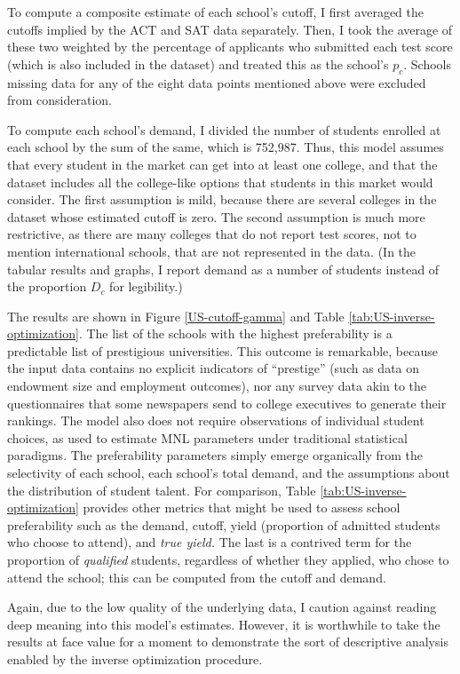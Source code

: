 \documentclass[12pt]{article}
\numberwithin{equation}{subsection}
\theoremstyle{definition}
\begin{document}
To compute a composite estimate of each school's cutoff, I first averaged the cutoffs implied by the ACT and SAT data separately. Then, I took the average of these two weighted by the percentage of applicants who submitted each test score (which is also included in the dataset) and treated this as the school's $p_c$. Schools missing data for any of the eight data points mentioned above were excluded from consideration.

To compute each school's demand, I divided the number of students enrolled at each school by the sum of the same, which is 752,987. Thus, this model assumes that every student in the market can get into at least one college, and that the dataset includes all the college-like options that students in this market would consider. The first assumption is mild, because there are several colleges in the dataset whose estimated cutoff is zero. The second assumption is much more restrictive, as there are many colleges that do not report test scores, not to mention international schools, that are not represented in the data. (In the tabular results and graphs, I report demand as a number of students instead of the proportion $D_c$ for legibility.)

The results are shown in Figure \ref{US-cutoff-gamma} and Table \ref{tab:US-inverse-optimization}. The list of the schools with the highest preferability is a predictable list of prestigious universities. This outcome is remarkable, because the input data contains no explicit indicators of ``prestige'' (such as data on endowment size and employment outcomes), nor any survey data akin to the questionnaires that some newspapers send to college executives to generate their rankings. The model also does not require observations of individual student choices, as used to estimate MNL parameters under traditional statistical paradigms. The preferability parameters simply emerge organically from the selectivity of each school, each school's total demand, and the assumptions about the distribution of student talent. For comparison, Table \ref{tab:US-inverse-optimization} provides other metrics that might be used to assess school preferability such as the demand, cutoff, yield (proportion of admitted students who choose to attend), and \emph{true yield.} The last is a contrived term for the proportion of \emph{qualified} students, regardless of whether they applied, who chose to attend the school; this can be computed from the cutoff and demand. 

Again, due to the low quality of the underlying data, I caution against reading deep meaning into this model's estimates. However, it is worthwhile to take the results at face value for a moment to demonstrate the sort of descriptive analysis enabled by the inverse optimization procedure. 
\end{document}
